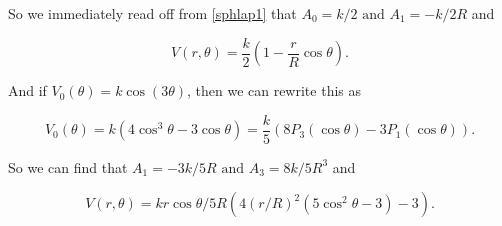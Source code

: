 \documentclass[english,a4paper,12pt]{report}
\begin{document}
{So we immediately read off from \cref{sphlap1} that \( A_0 = k /2 \text{ and }  A_1 = -k /2R \) and

\begin{equation}
    V(r,\theta )  = \frac{k}{2} (1 - \frac{r}{R} \cos \theta ).
\end{equation}	

And if \(V_0(\theta) = k\cos (3 \theta)\), then we can rewrite this as

\begin{equation}
    V_0(\theta) = k(4\cos ^3 \theta - 3\cos \theta) = \frac{k}{5} (8P_3 (\cos \theta) - 3P_1(\cos \theta)).
\end{equation}

So we can find that \(A_1 = -3k /5R \text{ and } A_3 = 8k /5R^3  \) and 

\begin{equation}
    V(r,\theta) = kr \cos \theta /5R  \left(4\left(r /R\right)^2(5\cos ^2 \theta-3)-3\right). 
\end{equation}} 
\end{document}
